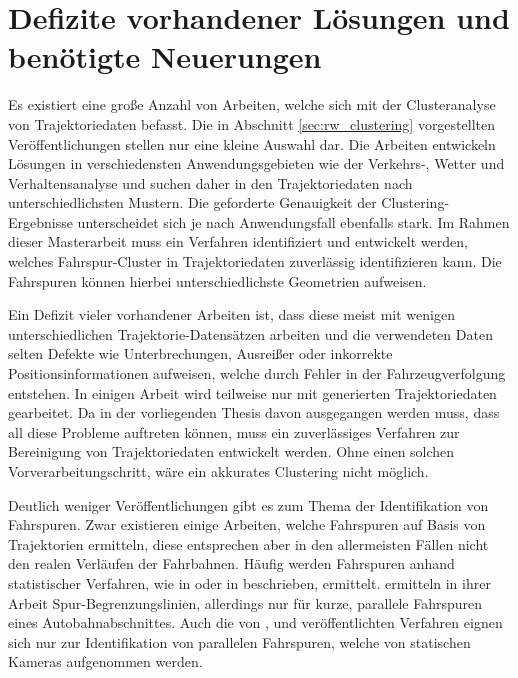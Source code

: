 \section{Defizite vorhandener Lösungen und benötigte Neuerungen}
\label{sec:rw_deficites}

Es existiert eine große Anzahl von Arbeiten, welche sich mit der Clusteranalyse von Trajektoriedaten
befasst. Die in Abschnitt \ref{sec:rw_clustering} vorgestellten Veröffentlichungen stellen nur eine
kleine Auswahl dar.
Die Arbeiten entwickeln Lösungen in verschiedensten Anwendungsgebieten wie der Verkehrs-, Wetter und Verhaltensanalyse
und suchen daher in den Trajektoriedaten nach unterschiedlichsten Mustern. Die geforderte Genauigkeit der
Clustering-Ergebnisse unterscheidet sich je nach Anwendungsfall ebenfalls stark.
Im Rahmen dieser Masterarbeit muss ein Verfahren identifiziert und entwickelt werden, welches Fahrspur-Cluster
in Trajektoriedaten zuverlässig identifizieren kann. Die Fahrspuren können hierbei unterschiedlichste
Geometrien aufweisen.

Ein Defizit vieler vorhandener Arbeiten ist, dass diese meist mit wenigen unterschiedlichen
Trajektorie-Datensätzen arbeiten und die verwendeten Daten selten Defekte wie Unterbrechungen,
Ausreißer oder inkorrekte Positionsinformationen aufweisen, welche durch Fehler in der Fahrzeugverfolgung entstehen.
In einigen Arbeit wird teilweise nur mit generierten Trajektoriedaten
gearbeitet. Da in der vorliegenden Thesis davon ausgegangen werden muss, dass all diese Probleme auftreten können,
muss ein zuverlässiges Verfahren zur Bereinigung von Trajektoriedaten entwickelt werden. Ohne einen solchen Vorverarbeitungschritt,
wäre ein akkurates Clustering nicht möglich.

Deutlich weniger Veröffentlichungen gibt es zum Thema der Identifikation von Fahrspuren. Zwar existieren
einige Arbeiten, welche Fahrspuren auf Basis von Trajektorien ermitteln, diese entsprechen aber
in den allermeisten Fällen nicht den realen Verläufen der Fahrbahnen. Häufig werden Fahrspuren
anhand statistischer Verfahren, wie in \cite[]{WeimingHu2006} oder in \cite[]{Teng2015} beschrieben, ermittelt.
\cite[]{Hsieh2006} ermitteln in ihrer Arbeit Spur-Begrenzungslinien, allerdings nur für kurze, parallele
Fahrspuren eines Autobahnabschnittes. Auch die von \cite[]{Liu2010}, \cite[]{Sochor2014} und \cite[]{Chen2013}
veröffentlichten Verfahren eignen sich nur zur Identifikation von parallelen Fahrspuren,
welche von statischen Kameras aufgenommen werden.


